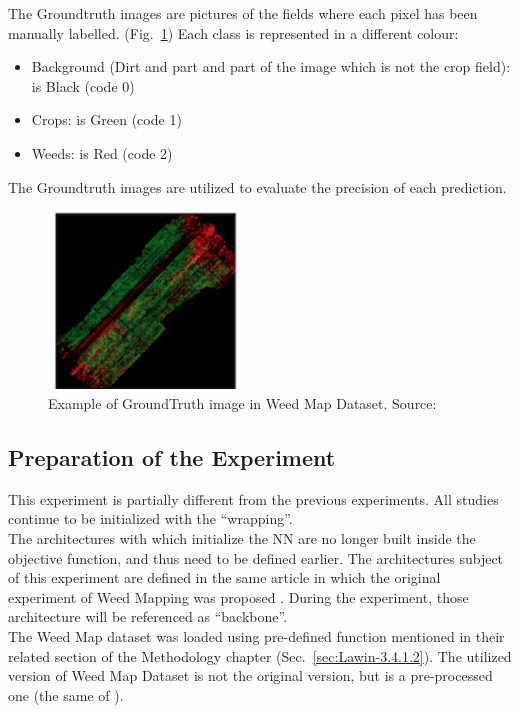 The Groundtruth images are pictures of the fields where each pixel has been manually labelled. (Fig.~\ref{fig:figure-4.5.4})
Each class is represented in a different colour:
\begin{itemize}[itemsep=0.1cm]
	\item Background (Dirt and part and part of the image which is not the crop field): is Black (code 0)
	\item Crops: is Green (code 1)
	\item Weeds: is Red (code 2)
\end{itemize}
The Groundtruth images are utilized to evaluate the precision of each prediction.
\begin{figure}[t]
	\centering
	\includegraphics[width=5cm]{figures/figure-4.5.4.png}
	\caption[Example of GroundTruth in Weed Map Dataset]{Example of GroundTruth image in Weed Map Dataset. Source:~\cite{Tesi-2.1}}
	\label{fig:figure-4.5.4}
\end{figure}

\subsection{Preparation of the Experiment}

This experiment is partially different from the previous experiments. All studies continue to be initialized with the “wrapping”.
\\[0.3cm]The architectures with which initialize the NN are no longer built inside the objective function, and thus need to be defined earlier. The architectures subject of this experiment are defined in the same article in which the original experiment of Weed Mapping was proposed \cite{WeedMap-PaperThesis}. During the experiment, those architecture will be referenced as “backbone”.
\\[0.3cm]The Weed Map dataset was loaded using pre-defined function mentioned in their related section of the Methodology chapter (Sec.~\ref{sec:Lawin-3.4.1.2}). The utilized version of Weed Map Dataset is not the original version, but is a pre-processed one (the same of \cite{WeedMap-PaperThesis}).

